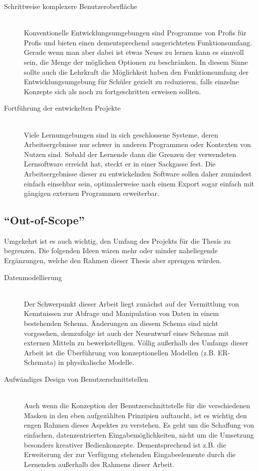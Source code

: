 \begin{description}
\item[Schrittweise komplexere Benutzeroberfläche] \hfill \\
  Konventionelle Entwicklungsumgebungen sind Programme von Profis für Profis und bieten einen dementsprechend ausgerichteten Funktionsumfang. Gerade wenn man aber dabei ist etwas Neues zu lernen kann es sinnvoll sein, die Menge der möglichen Optionen zu beschränken. In diesem Sinne sollte auch die Lehrkraft die Möglichkeit haben den Funktionsumfang der Entwicklungsumgebung für Schüler gezielt zu reduzieren, falls einzelne Konzepte sich als noch zu fortgeschritten erweisen sollten.
\item[Fortführung der entwickelten Projekte] \hfill \\
  Viele Lernumgebungen sind in sich geschlossene Systeme, deren Arbeitsergebnisse nur schwer in anderen Programmen oder Kontexten von Nutzen sind. Sobald der Lernende dann die Grenzen der verwendeten Lernsoftware erreicht hat, steckt er in einer Sackgasse fest. Die Arbeitsergebnisse dieser zu entwickelnden Software sollen daher zumindest einfach einsehbar sein, optimalerweise nach einem Export sogar einfach mit gängigen externen Programmen erweiterbar.
  
  
\end{description}

\subsection{``Out-of-Scope''}
\label{sec:out-of-scope}

Umgekehrt ist es auch wichtig, den Umfang des Projekts für die Thesis zu begrenzen. Die folgenden Ideen wären mehr oder minder naheliegende Ergänzungen, welche den Rahmen dieser Thesis aber sprengen würden.

\begin{description}
\item[Datenmodellierung] \hfill \\
  Der Schwerpunkt dieser Arbeit liegt zunächst auf der Vermittlung von Kenntnissen zur Abfrage und Manipulation von Daten in einem bestehenden Schema. Änderungen an diesem Schema sind nicht vorgesehen, demzufolge ist auch der Neuentwurf eines Schemas mit externen Mitteln zu bewerkstelligen. Völlig außerhalb des Umfangs dieser Arbeit ist die Überführung von konzeptionellen Modellen (z.B. ER-Schemata) in physikalische Modelle.
\item[Aufwändiges Design von Benutzerschnittstellen] \hfill \\
  Auch wenn die Konzeption der Benutzerschnittstelle für die verschiedenen Masken in den eben aufgezählten Prinzipien auftaucht, ist es wichtig den engen Rahmen dieses Aspektes zu verstehen. Es geht um die Schaffung von einfachen, datenzentrierten Eingabemöglichkeiten, nicht um die Umsetzung besonders kreativer Bedienkonzepte. Dementsprechend ist z.B. die Erweiterung der zur Verfügung stehenden Eingabeelemente durch die Lernenden außerhalb des Rahmens dieser Arbeit.
\end{description}

